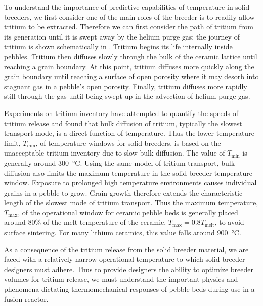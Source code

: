 To understand the importance of predictive capabilities of temperature in solid breeders, we first consider one of the main roles of the breeder is to readily allow tritium to be extracted. Therefore we can first consider the path of tritium from its generation until it is swept away by the helium purge gas; the journey of tritium is shown schematically in . Tritium begins its life internally inside pebbles. Tritium then diffuses slowly through the bulk of the ceramic lattice until reaching a grain boundary. At this point, tritium diffuses more quickly along the grain boundary until reaching a surface of open porosity where it may desorb into stagnant gas in a pebble's open porosity. Finally, tritium diffuses more rapidly still through the gas until being swept up in the advection of helium purge gas.\cite{Federici1990} 

Experiments on tritium inventory have attempted to quantify the speeds of tritium release and found that bulk diffusion of tritium, typically the slowest transport mode, is a direct function of temperature.\cite{Franza2013} Thus the lower temperature limit, $T_\text{min}$, of temperature windows for solid breeders, is based on the unacceptable tritium inventory due to slow bulk diffusion. The value of $T_\text{min}$ is generally around \SI{300}{\celsius}. Using the same model of tritium transport, bulk diffusion also limits the maximum temperature in the solid breeder temperature window. Exposure to prolonged high temperature environments causes individual grains in a pebble to grow. Grain growth therefore extends the characteristic length of the slowest mode of tritium transport. Thus the maximum temperature, $T_\text{max}$, of the operational window for ceramic pebble beds is generally placed around 80\% of the melt temperature of the ceramic, $T_\text{max} = 0.8 T_\text{melt}$, to avoid surface sintering. For many lithium ceramics, this value falls around \SI{900}{\celsius}.

As a consequence of the tritium release from the solid breeder material, we are faced with a relatively narrow operational temperature to which solid breeder designers must adhere. Thus to provide designers the ability to optimize breeder volumes for tritium release, we must understand the important physics and phenomena dictating thermomechanical responses of pebble beds during use in a fusion reactor.



